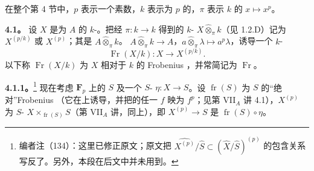 在整个第 4 节中，$p$ 表示一个素数，$k$ 表示为 $p$ 的，$\pi$ 表示 $k$ 的 $x\mapsto x^p$。

\textbf{4.1。} 设 $X$ 是为 $A$ 的 $k$-。把经 $\pi:k\to k$ 得到的 $k$- $X\widehat\otimes_\pi k$（见 1.2.D）记为 $X^{(p/k)}$ 或 $X^{(p)}$；其是 $A\widehat\otimes_\pi k$。 $A\widehat\otimes_\pi k\to A$，$a\widehat\otimes_\pi\lambda\mapsto a^p\lambda$，诱导一个 $k$-
\[
\operatorname{Fr}(X/k):X\longrightarrow X^{(p/k)}.
\]
以下称 $\operatorname{Fr}(X/k)$ 为 $X$ 相对于 $k$ 的 Frobenius ，并常简记为 $\operatorname{Fr}$。

\textbf{4.1.1。}\footnote{编者注（134）：这里已修正原文；原文把 $\widehat{X^{(p)}}/\widehat S\subset(\widehat X/\widehat S)^{(p)}$ 的包含关系写反了。另外，本段在后文中并未用到。}
现在考虑 $\mathbf F_p$ 上的 $S$ 及一个 $S$- $\eta:X\to S$。设 $\operatorname{fr}(S)$ 为 $S$ 的“绝对”Frobenius （它在上诱导，并把的任一 $f$ 映为 $f^p$；见第 VII$_A$ 讲 4.1），$X^{(p)}$ 为 $S$- $X\times_{\operatorname{fr}(S)}S$（第 VII$_A$ 讲，同上），即 $X^{(p)}\to S$ 是 $\operatorname{fr}(S)\circ\eta$。

